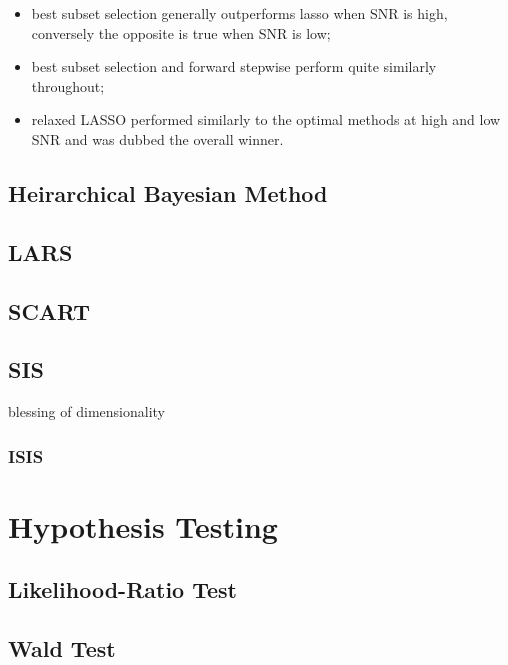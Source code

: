 \begin{itemize}
    \item best subset selection generally outperforms lasso when SNR is high, conversely the opposite is true when SNR is low; 
    \item best subset selection and forward stepwise perform quite similarly throughout;
    \item relaxed LASSO performed similarly to the optimal methods at high and low SNR and was dubbed the overall winner.
\end{itemize}

\subsection{Heirarchical Bayesian Method} 
\subsection{LARS}
\subsection{SCART}
\subsection{SIS}
blessing of dimensionality 
\subsubsection{ISIS}

\section{Hypothesis Testing}
\subsection{Likelihood-Ratio Test}
\subsection{Wald Test}
